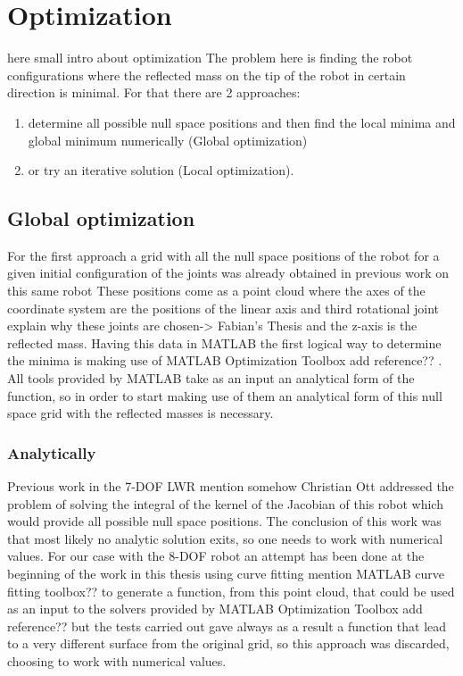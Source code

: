 \chapter{Optimization}
\label{section:optimization}

{\color{red} here small intro about optimization }
The problem here is finding the robot configurations where the reflected mass on the tip of the robot in certain direction is minimal. For that there are 2 approaches:


\begin{enumerate}
	\item determine all possible null space positions and then find the local minima and global minimum numerically (Global optimization)
	\item or try an iterative solution (Local optimization).
\end{enumerate}




\section{Global optimization}

For the first approach a grid with all the null space positions of the robot for a given initial configuration of the joints was already obtained in previous work on this same robot \cite{fabianthesis}  
These positions come as a point cloud where the axes of the coordinate system are the positions of the linear axis and third rotational joint {\color{red}explain why these joints are chosen-> Fabian’s Thesis} and the z-axis is the reflected mass. Having this data in MATLAB the first logical way to determine the minima is making use of MATLAB Optimization Toolbox  {\color{red} add reference?? }. All tools provided by MATLAB take as an input an analytical form of the function, so in order to start making use of them an analytical form of this null space grid with the reflected masses is necessary.



\subsection{Analytically}

Previous work in the 7-DOF LWR  {\color{red}mention somehow Christian Ott} addressed the problem of solving the integral of the kernel of the Jacobian of this robot which would provide all possible null space positions. The conclusion of this work was that most likely no analytic solution exits, so one needs to work with numerical values. 
For our case with the 8-DOF robot an attempt has been done at the beginning of the work in this thesis using curve fitting  {\color{red}mention MATLAB curve fitting toolbox??} to generate a function, from this point cloud, that could be used as an input to the solvers provided by MATLAB Optimization Toolbox {\color{red} add reference?? } but the tests carried out gave always as a result a function that lead to a very different surface from the original grid, so this approach was discarded, choosing to work with numerical values.



